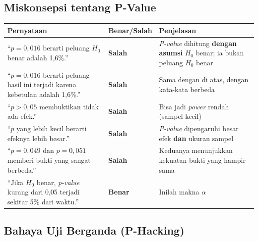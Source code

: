 \documentclass[
  indonesian,
  letterpaper,
]{book}
\newcounter{none} %
\begin{document}
\subsection{Miskonsepsi tentang
P-Value}\label{miskonsepsi-tentang-p-value}

{\def\LTcaptype{none} %
\begin{longtable}[]{@{}
  >{\raggedright\arraybackslash}p{}
  >{\centering\arraybackslash}p{}
  >{\raggedright\arraybackslash}p{}@{}}
\toprule\noalign{}
\begin{minipage}[b]{\linewidth}\raggedright
Pernyataan
\end{minipage} & \begin{minipage}[b]{\linewidth}\centering
Benar/Salah
\end{minipage} & \begin{minipage}[b]{\linewidth}\raggedright
Penjelasan
\end{minipage} \\
\midrule\noalign{}
\endhead
\bottomrule\noalign{}
\endlastfoot
``\(p = 0{,}016\) berarti peluang \(H_0\) benar adalah 1,6\%.'' &
\textbf{Salah} & \emph{P-value} dihitung \textbf{dengan asumsi} \(H_0\)
benar; ia bukan peluang \(H_0\) benar \\
``\(p = 0{,}016\) berarti peluang hasil ini terjadi karena kebetulan
adalah 1,6\%.'' & \textbf{Salah} & Sama dengan di atas, dengan kata-kata
berbeda \\
``\(p > 0{,}05\) membuktikan tidak ada efek.'' & \textbf{Salah} & Bisa
jadi \emph{power} rendah (sampel kecil) \\
``\(p\) yang lebih kecil berarti efeknya lebih besar.'' & \textbf{Salah}
& \emph{P-value} dipengaruhi besar efek \textbf{dan} ukuran sampel \\
``\(p = 0{,}049\) dan \(p = 0{,}051\) memberi bukti yang sangat
berbeda.'' & \textbf{Salah} & Keduanya menunjukkan kekuatan bukti yang
hampir sama \\
``Jika \(H_0\) benar, \emph{p-value} kurang dari 0,05 terjadi sekitar
5\% dari waktu.'' & \textbf{Benar} & Inilah makna \(\alpha\) \\
\end{longtable}
}

\subsection{Bahaya Uji Berganda
(P-Hacking)}\label{bahaya-uji-berganda-p-hacking}
\end{document}
